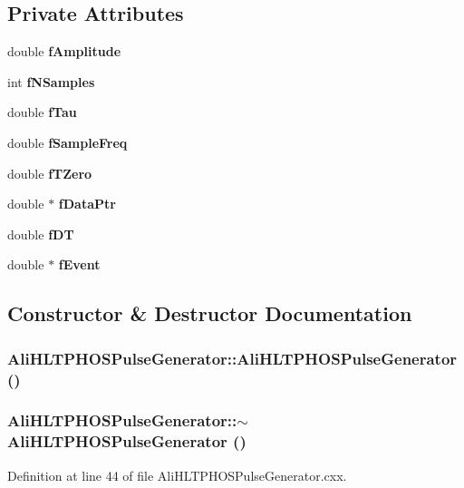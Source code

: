 \subsection*{Private Attributes}
\begin{CompactItemize}
\item 
double {\bf f\-Amplitude}
\item 
int {\bf f\-NSamples}
\item 
double {\bf f\-Tau}
\item 
double {\bf f\-Sample\-Freq}
\item 
double {\bf f\-TZero}
\item 
double $\ast$ {\bf f\-Data\-Ptr}
\item 
double {\bf f\-DT}
\item 
double $\ast$ {\bf f\-Event}
\end{CompactItemize}


\subsection{Constructor \& Destructor Documentation}
\subsubsection{\setlength{\rightskip}{0pt plus 5cm}Ali\-HLTPHOSPulse\-Generator::Ali\-HLTPHOSPulse\-Generator ()}\label{classAliHLTPHOSPulseGenerator_AliHLTPHOSPulseGeneratora0}


\subsubsection{\setlength{\rightskip}{0pt plus 5cm}Ali\-HLTPHOSPulse\-Generator::$\sim${\bf Ali\-HLTPHOSPulse\-Generator} ()\hspace{0.3cm}{\tt  [virtual]}}\label{classAliHLTPHOSPulseGenerator_AliHLTPHOSPulseGeneratora1}




Definition at line 44 of file Ali\-HLTPHOSPulse\-Generator.cxx.

